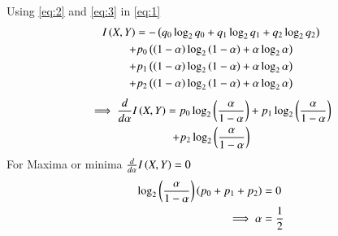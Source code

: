 \documentclass[journal,12pt,twocolumn]{IEEEtran}
\theoremstyle{remark}
\begin{document}
Using \eqref{eq:2} and \eqref{eq:3} in \eqref{eq:1}
\begin{multline}
I\left(X,Y\right)= -\left(q_0\log_2 q_0 + q_1\log_2 q_1 +q_2\log_2 q_2\right) \\+ p_0\left(\left(1-\alpha\right) \log_2 \left(1-\alpha\right) + \alpha \log_2 \alpha\right)\\+p_1\left(\left(1-\alpha\right) \log_2 \left(1-\alpha\right) + \alpha \log_2 \alpha\right)\\+p_2\left(\left(1-\alpha\right) \log_2 \left(1-\alpha\right) + \alpha \log_2 \alpha\right)
\end{multline}
\begin{multline}
\implies \frac{d}{d\alpha}I\left(X,Y\right) = p_0\log_2 \left(\frac{\alpha}{1-\alpha}\right)+p_1\log_2 \left(\frac{\alpha}{1-\alpha}\right)\\+p_2\log_2 \left(\frac{\alpha}{1-\alpha}\right)
\end{multline}
For Maxima or minima $\frac{d}{d\alpha}I\left(X,Y\right) = 0$
\begin{align}
\log_2 \left(\frac{\alpha}{1-\alpha}\right)\left(p_0+p_1+p_2\right) &= 0\\
\implies \alpha &= \frac{1}{2}
\end{align}
\end{document}
